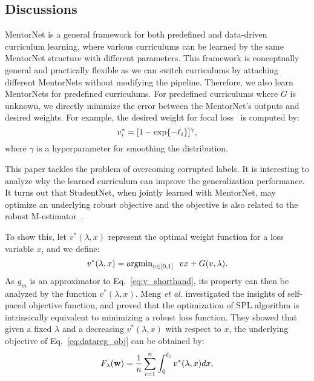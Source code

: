 \documentclass{article}
\newcommand{\etal}{\emph{et al.}}
\begin{document}
\subsection{Discussions}\label{sec:robust_learning}
MentorNet is a general framework for both predefined and data-driven curriculum learning, where various curriculums can be learned by the same MentorNet structure with different parameters. This framework is conceptually general and practically flexible as we can switch curriculums by attaching different MentorNets without modifying the pipeline. Therefore, we also learn MentorNets for predefined curriculums. For predefined curriculums where $G$ is unknown, we directly minimize the error between the MentorNet's outputs and desired weights. For example, the desired weight for focal loss~\cite{lin2017focal} is computed by: 
\begin{equation}
\label{eq:focal_loss_weight}
v_i^* = [1-\exp\{-\ell_i\}]^\gamma,
\vspace{-2mm}
\end{equation}
where $\gamma$ is a hyperparameter for smoothing the distribution.

This paper tackles the problem of overcoming corrupted labels. It is interesting to analyze why the learned curriculum can improve the generalization performance. It turns out that StudentNet, when jointly learned with MentorNet, may optimize an underlying robust objective and the objective is also related to the robust M-estimator~\cite{huber2011robust}.

To show this, let $v^*(\lambda,x)$ represent the optimal weight function for a loss variable $x$, and we define:
\begin{equation}
\label{eq:v_shorthand}
v^*(\lambda, x) = \text{argmin}_{v \in [0,1]} \ \ v x + G(v, \lambda).
\vspace{-1mm}
\end{equation}
As $g_m$ is an approximator to Eq.~\eqref{eq:v_shorthand}, its property can then be analyzed by the function $v^*(\lambda, x)$. Meng \etal {} investigated the insights of self-paced objective function, and proved that the optimization of SPL algorithm is intrinsically equivalent to minimizing a robust loss function. They showed that given a fixed $\lambda$ and a decreasing $v^*(\lambda, x)$ with respect to $x$, the underlying objective of Eq.~\eqref{eq:datareg_obj} can be obtained by:
\begin{equation}
\label{eq:latent_f_lambda}
F_\lambda(\mathbf{w}) = \frac{1}{n} \sum_{i=1}^n \int_0^{\ell_i}v^*(\lambda,x) d x,
\vspace{-3mm}
\end{equation}
\end{document}
